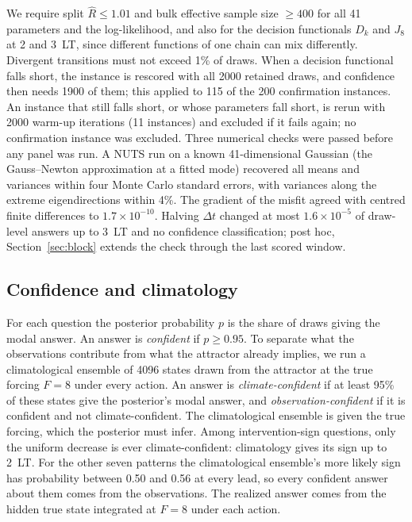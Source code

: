\documentclass[11pt]{article}
\begin{document}
We require split $\hat R \le 1.01$ and bulk effective sample size $\ge 400$ \citep{vehtari2021ranknormalization} for all 41 parameters and the log-likelihood, and also for the decision functionals $D_k$ and $J_8$ at 2 and 3~LT, since different functions of one chain can mix differently. Divergent transitions must not exceed 1\% of draws. When a decision functional falls short, the instance is rescored with all 2000 retained draws, and confidence then needs 1900 of them; this applied to 115 of the 200 confirmation instances. An instance that still falls short, or whose parameters fall short, is rerun with 2000 warm-up iterations (11 instances) and excluded if it fails again; no confirmation instance was excluded. Three numerical checks were passed before any panel was run. A NUTS run on a known 41-dimensional Gaussian (the Gauss--Newton approximation at a fitted mode) recovered all means and variances within four Monte Carlo standard errors, with variances along the extreme eigendirections within 4\%. The gradient of the misfit agreed with centred finite differences to $1.7 \times 10^{-10}$. Halving $\Delta t$ changed at most $1.6 \times 10^{-5}$ of draw-level answers up to 3~LT and no confidence classification; post hoc, Section~\ref{sec:block} extends the check through the last scored window.

\subsection{Confidence and climatology}
For each question the posterior probability $p$ is the share of draws giving the modal answer. An answer is \emph{confident} if $p \ge 0.95$. To separate what the observations contribute from what the attractor already implies, we run a climatological ensemble of 4096 states drawn from the attractor at the true forcing $F = 8$ under every action. An answer is \emph{climate-confident} if at least 95\% of these states give the posterior's modal answer, and \emph{observation-confident} if it is confident and not climate-confident. The climatological ensemble is given the true forcing, which the posterior must infer. Among intervention-sign questions, only the uniform decrease is ever climate-confident: climatology gives its sign up to 2~LT. For the other seven patterns the climatological ensemble's more likely sign has probability between 0.50 and 0.56 at every lead, so every confident answer about them comes from the observations. The realized answer comes from the hidden true state integrated at $F = 8$ under each action.
\end{document}
